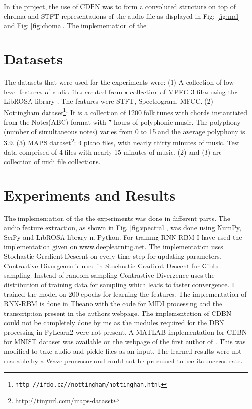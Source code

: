 \documentclass[letterpaper, 10 pt, conference]{ieeeconf}
\begin{document}
In the project, the use of CDBN was to form a convoluted structure on top of chroma and STFT representations of the audio file as displayed in Fig: \ref{fig:mel} and Fig: \ref{fig:choma}. The implementation of the 

\section{Datasets}
The datasets that were used for the experiments were: (1) A collection of low-level features of audio files created from a collection of MPEG-3 files using the LibROSA library \cite{c0}. The features were STFT, Spectrogram, MFCC. (2)  Nottingham dataset\footnote{\tt{http://ifdo.ca//nottingham/nottingham.html}}: It is a collection of 1200 folk tunes with chords instantiated from the Notes(ABC) format with 7 hours of polyphonic music. The polyphony (number of simultaneous notes) varies from 0 to 15 and the average polyphony is 3.9. (3) MAPS dataset\footnote{\url{http://tinyurl.com/maps-dataset}}: 6 piano files, with nearly thirty minutes of music. Test data comprised of 4 files with nearly 15 minutes of music. (2) and (3) are collection of midi file collections. 

\section{Experiments and Results}
The implementation of the the experiments was done in different parts. The audio feature extraction, as shown in Fig. \ref{fig:spectral}, was done using NumPy, SciPy and LibROSA library \cite{c0} in Python. For training RNN-RBM I have used the implementation given on \url{www.deeplearning.net}. The implementation uses Stochastic Gradient Descent on every time step for updating parameters. Contrastive Divergence is used in Stochastic Gradient Descent for Gibbs sampling. Instead of random sampling Contrastive Divergence uses the distribution of training data for sampling which leads to faster convergence. I trained the model on 200 epochs for learning the features. The implementation of RNN-RBM is done in Theano with the code for MIDI processing and the transcription present in the authors webpage\cite{c8}. The implementation of CDBN could not be completely done by me as the modules required for the DBN processing in PyLearn2 were not present. A MATLAB implementation for CDBN for MNIST dataset was available on the webpage of the first author of \cite{c12}. This was modified to take audio and pickle files as an input. The learned results were not readable by a Wave processor and could not be processed to see its success rate.
\end{document}

